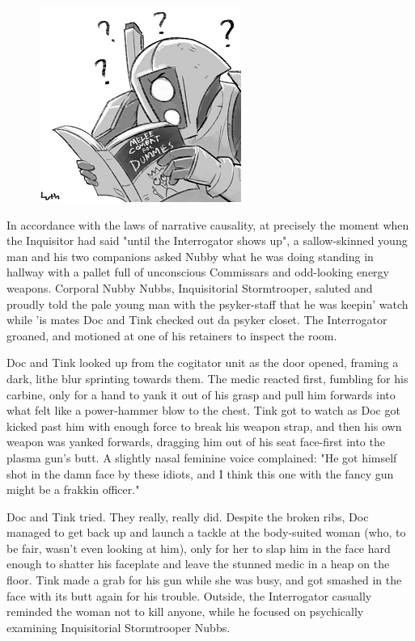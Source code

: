 \begin{figure}
	\begin{center}
		\includegraphics[width=\figwidth]{pics/21/91.png}
	\end{center}
\end{figure}
In accordance with the laws of narrative causality, at precisely the moment when the Inquisitor had said "until the Interrogator shows up", a sallow-skinned young man and his two companions asked Nubby what he was doing standing in hallway with a pallet full of unconscious Commissars and odd-looking energy weapons. 
Corporal Nubby Nubbs, Inquisitorial Stormtrooper, saluted and proudly told the pale young man with the psyker-staff that he was keepin' watch while 'is mates Doc and Tink checked out da psyker closet. 
The Interrogator groaned, and motioned at one of his retainers to inspect the room.

Doc and Tink looked up from the cogitator unit as the door opened, framing a dark, lithe blur sprinting towards them. 
The medic reacted first, fumbling for his carbine, only for a hand to yank it out of his grasp and pull him forwards into what felt like a power-hammer blow to the chest. 
Tink got to watch as Doc got kicked past him with enough force to break his weapon strap, and then his own weapon was yanked forwards, dragging him out of his seat face-first into the plasma gun's butt. 
A slightly nasal feminine voice complained: 
"He got himself shot in the damn face by these idiots, and I think this one with the fancy gun might be a frakkin officer."

Doc and Tink tried. 
They really, really did. 
Despite the broken ribs, Doc managed to get back up and launch a tackle at the body-suited woman (who, to be fair, wasn't even looking at him), only for her to slap him in the face hard enough to shatter his faceplate and leave the stunned medic in a heap on the floor. 
Tink made a grab for his gun while she was busy, and got smashed in the face with its butt again for his trouble. 
Outside, the Interrogator casually reminded the woman not to kill anyone, while he focused on psychically examining Inquisitorial Stormtrooper Nubbs. 


